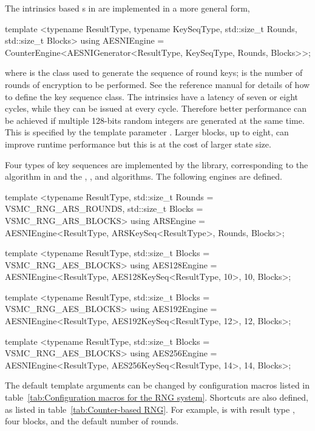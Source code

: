 The \aesni intrinsics based \rng{}s in \textcite{Salmon:2011um} are implemented
in a more general form,
\begin{cppcode}
  template <typename ResultType, typename KeySeqType, std::size_t Rounds,
  std::size_t Blocks>
  using AESNIEngine =
  CounterEngine<AESNIGenerator<ResultType, KeySeqType, Rounds, Blocks>>;
\end{cppcode}
where  is the class used to generate the sequence of
round keys;  is the number of rounds of \aes encryption to be
performed. See the reference manual for details of how to define the key
sequence class. The \aesni intrinsics have a latency of seven or eight cycles,
while they can be issued at every cycle. Therefore better performance can be
achieved if multiple 128-bits random integers are generated at the same time.
This is specified by the template parameter . Larger blocks,
up to eight, can improve runtime performance but this is at the cost of larger
state size.

Four types of key sequences are implemented by the library, corresponding to
the \ars algorithm in \textcite{Salmon:2011um} and the , , and
 algorithms. The following \rng engines are defined.
\begin{cppcode}
  template <typename ResultType, std::size_t Rounds = VSMC_RNG_ARS_ROUNDS,
  std::size_t Blocks = VSMC_RNG_ARS_BLOCKS>
  using ARSEngine =
  AESNIEngine<ResultType, ARSKeySeq<ResultType>, Rounds, Blocks>;

  template <typename ResultType, std::size_t Blocks = VSMC_RNG_AES_BLOCKS>
  using AES128Engine =
  AESNIEngine<ResultType, AES128KeySeq<ResultType, 10>, 10, Blocks>;

  template <typename ResultType, std::size_t Blocks = VSMC_RNG_AES_BLOCKS>
  using AES192Engine =
  AESNIEngine<ResultType, AES192KeySeq<ResultType, 12>, 12, Blocks>;

  template <typename ResultType, std::size_t Blocks = VSMC_RNG_AES_BLOCKS>
  using AES256Engine =
  AESNIEngine<ResultType, AES256KeySeq<ResultType, 14>, 14, Blocks>;
\end{cppcode}
The default template arguments can be changed by configuration macros listed in
table~\ref{tab:Configuration macros for the RNG system}. Shortcuts are also
defined, as listed in table~\ref{tab:Counter-based RNG}. For example,
 is  with result type
, four blocks, and the default number of rounds.

